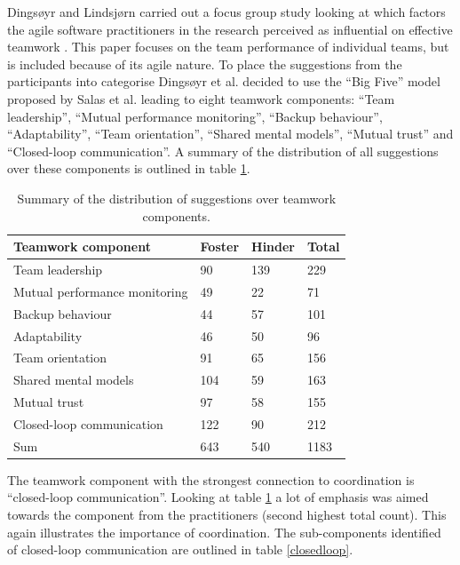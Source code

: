 Dingsøyr and Lindsjørn carried out a focus group study looking at which factors the agile software practitioners in the research perceived as influential on effective teamwork \cite{Dingsoyr2013c}. This paper focuses on the team performance of individual teams, but is included because of its agile nature. To place the suggestions from the participants into categorise Dingsøyr et al. decided to use the ``Big Five'' model proposed by Salas et al. \cite{Salas2005} leading to eight teamwork components: ``Team leadership'', ``Mutual performance monitoring'', ``Backup behaviour'', ``Adaptability'', ``Team orientation'', ``Shared mental models'', ``Mutual trust'' and ``Closed-loop communication''. A summary of the distribution of all suggestions over these components is outlined in table \ref{summary2}.

\begin{table}[H]
\begin{center}
    \begin{tabular}{ | p{6cm} | p{2.5cm} | p{2.5cm} | p{2.5cm} |}
    \hline
    \textbf{Teamwork component} & \textbf{Foster} & \textbf{Hinder} & \textbf{Total} \\ \hline
    Team leadership & 90 & 139 & 229 \\ \hline
    Mutual performance monitoring & 49 & 22 & 71 \\ \hline
    Backup behaviour & 44 & 57 & 101 \\ \hline
    Adaptability & 46 & 50 & 96 \\ \hline
    Team orientation & 91 & 65 & 156 \\ \hline
    Shared mental models & 104 & 59 & 163 \\ \hline
    Mutual trust & 97 & 58 & 155 \\ \hline
    Closed-loop communication & 122 & 90 & 212 \\ \hline
    Sum & 643 & 540 & 1183 \\ \hline
    \end{tabular}
    \caption{Summary of the distribution of suggestions over teamwork components.}
    \label{summary2}
\end{center}
\end{table}

The teamwork component with the strongest connection to coordination is ``closed-loop communication''. Looking at table \ref{summary2} a lot of emphasis was aimed towards the component from the practitioners (second highest total count). This again illustrates the importance of coordination. The sub-components identified of closed-loop communication are outlined in table \ref{closedloop}.

